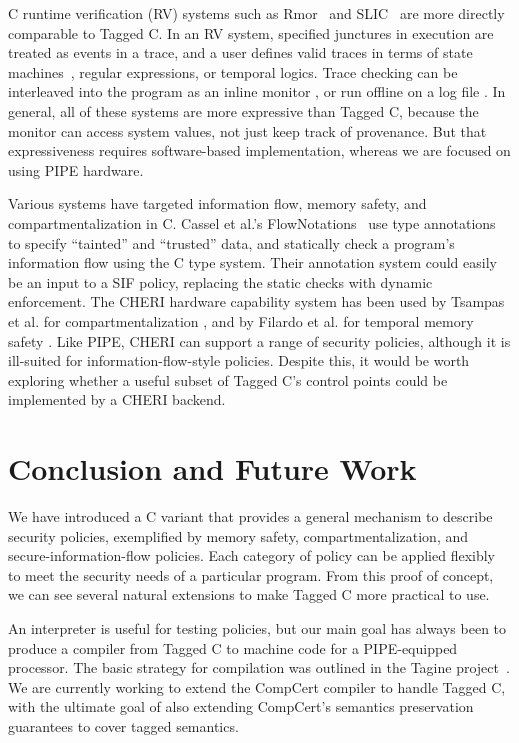 \documentclass{llncs}
\begin{document}
C runtime verification (RV) systems such as {\sc Rmor}~\cite{Havelund08:RVC} and
SLIC~\cite{Ball02:slic}
are more directly comparable to Tagged C. In an RV system, specified junctures in
execution are treated as events in a trace, and a user defines valid traces
in terms of state machines~\cite{Schneider00:Automata}, regular expressions, or temporal logics.
Trace checking can be interleaved into the program as
an inline monitor \cite{Erlingsson04:IRM}, or run offline on a log file \cite{Havelund22:LogScope}.
In general, all of these systems are more expressive than Tagged C, because the
monitor can access system values, not just keep track of provenance. But that expressiveness
requires software-based implementation, whereas we are focused on using PIPE hardware.

Various systems have targeted information flow, memory safety, and compartmentalization in C.
Cassel et al.'s FlowNotations~\cite{Cassel19:FlowNotation} use type annotations to specify ``tainted'' and ``trusted'' data,
and statically check a program's information flow using the C type system. Their annotation system
could easily be an input to a SIF policy, replacing the static checks with dynamic enforcement.
The CHERI hardware capability system has been used by Tsampas et al. for compartmentalization
\cite{Tsampas2017:TowardsAC}, and by Filardo et al. for temporal memory safety
\cite{NWF20:Cornucopia}. Like PIPE, CHERI can support a range of security policies,
although it is ill-suited for information-flow-style policies. Despite this, it would
be worth exploring whether a useful subset of Tagged C's control points could be implemented
by a CHERI backend.

\section{Conclusion and Future Work}
\label{sec:conclusion}

We have introduced a C variant that provides a general mechanism to describe security
policies, exemplified by memory safety, compartmentalization, and secure-information-flow
policies. Each category of policy can be applied flexibly to meet the security needs of
a particular program. From this proof of concept, we can see several natural extensions
to make Tagged C more practical to use.

An interpreter is useful for testing policies, but our main goal has always been to
produce a compiler from Tagged C to machine code for a PIPE-equipped processor.
The basic strategy for compilation was outlined in the Tagine project~\cite{Chhak21:Tagine}.
We are currently working to extend the CompCert compiler to handle Tagged C, with the ultimate
goal of also extending CompCert's semantics preservation guarantees to cover tagged semantics.
\end{document}
